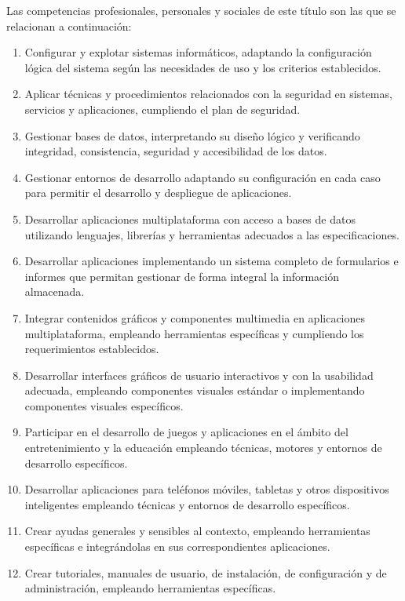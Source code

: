 Las competencias profesionales, personales y sociales de este título son las que se relacionan a continuación:
\begin{enumerate}[label=\alph*)]
\item Configurar y explotar sistemas informáticos, adaptando la configuración lógica del sistema según las necesidades de uso y los criterios establecidos.
\item Aplicar técnicas y procedimientos relacionados con la seguridad en sistemas, servicios y aplicaciones, cumpliendo el plan de seguridad.
\item Gestionar bases de datos, interpretando su diseño lógico y verificando integridad, consistencia, seguridad y accesibilidad de los datos.
\item Gestionar entornos de desarrollo adaptando su configuración en cada caso para permitir el desarrollo y despliegue de aplicaciones.
\item \label{comp:01e} Desarrollar aplicaciones multiplataforma con acceso a bases de datos utilizando lenguajes, librerías y herramientas adecuados a las especificaciones.
\item Desarrollar aplicaciones implementando un sistema completo de formularios e informes que permitan gestionar de forma integral la información almacenada.
\item Integrar contenidos gráficos y componentes multimedia en aplicaciones multiplataforma, empleando herramientas específicas y cumpliendo los requerimientos establecidos.
\item Desarrollar interfaces gráficos de usuario interactivos y con la usabilidad adecuada, empleando componentes visuales estándar o implementando componentes visuales específicos.
\item Participar en el desarrollo de juegos y aplicaciones en el ámbito del entretenimiento y la educación empleando técnicas, motores y entornos de desarrollo específicos.
\item \label{comp:02j}Desarrollar aplicaciones para teléfonos móviles, tabletas y otros dispositivos inteligentes empleando técnicas y entornos de desarrollo específicos.
\item Crear ayudas generales y sensibles al contexto, empleando herramientas específicas e integrándolas en sus correspondientes aplicaciones.
\item Crear tutoriales, manuales de usuario, de instalación, de configuración y de administración, empleando herramientas específicas.

\end{enumerate}
